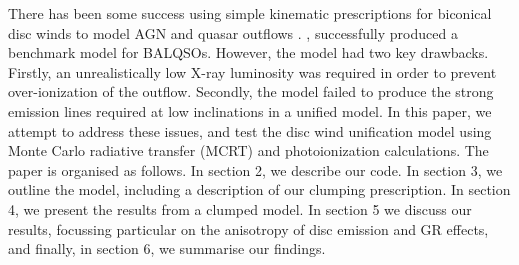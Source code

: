 \documentclass[preprint, a4paper, 11pt]{aastex}
\begin{document}
There has been some success using simple
kinematic prescriptions for biconical disc winds to model 
AGN and quasar outflows \citep{simlong2008,higginbottom2013}. 
\cite[][hereafter H13]{higginbottom2013},
successfully produced a benchmark model for BALQSOs. However, the model
had two key drawbacks. Firstly, an unrealistically low X-ray luminosity
was required in order to prevent over-ionization of the outflow.
Secondly, the model failed to produce the strong emission lines 
required at low inclinations in a unified model.
In this paper, we attempt to address these issues, and test the disc wind 
unification model using Monte Carlo radiative transfer (MCRT) and photoionization 
calculations. The paper is organised as follows.
In section 2, we describe our code. In section 3, we outline the model, including 
a description of our clumping prescription. In section 4, we present the results 
from a clumped model. In section 5 we discuss our results, 
focussing particular on the anisotropy of 
disc emission and GR effects, and finally, in section 6, we summarise our findings.






\end{document}
